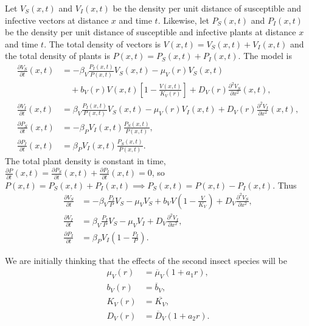\documentclass{jpmarticle}
\begin{document}
Let $V_S(x, t)$ and $V_I(x, t)$ be the density per unit distance of
susceptible and infective vectors at distance $x$ and time $t$.
Likewise, let $P_S(x, t)$ and $P_I(x, t)$ be the density per unit
distance of susceptible and infective plants at distance $x$ and time
$t$.  The total density of vectors is
$V(x, t) = V_S(x, t) + V_I(x, t)$ and the total density of plants is
$P(x, t) = P_S(x, t) + P_I(x, t)$.  The model is
\begin{equation}
  \begin{split}
    \frac{\partial V_S}{\partial t}(x, t)
    &= - \beta_V \frac{P_I(x, t)}{P(x, t)} V_S(x, t)
    - \mu_V(r) V_S(x, t)
    \\
    & \quad
    {} + b_V(r) V(x, t) \left[1 - \frac{V(x, t)}{K_V(r)}\right]
    + D_V(r) \frac{\partial^2 V_S}{\partial x^2}(x, t),
    \\
    \frac{\partial V_I}{\partial t}(x, t)
    &= \beta_V \frac{P_I(x, t)}{P(x, t)} V_S(x, t)
    - \mu_V(r) V_I(x, t)
    + D_V(r) \frac{\partial^2 V_I}{\partial x^2}(x, t),
    \\
    \frac{\partial P_S}{\partial t}(x, t)
    &= - \beta_P V_I(x, t) \frac{P_S(x, t)}{P(x, t)},
    \\
    \frac{\partial P_I}{\partial t}(x, t)
    &= \beta_P V_I(x, t) \frac{P_S(x, t)}{P(x, t)}.
  \end{split}
\end{equation}
The total plant density is constant in time, $\frac{\partial
  P}{\partial t}(x, t) = \frac{\partial P_S}{\partial t}(x, t)
+ \frac{\partial P_I}{\partial t}(x, t) = 0$, so
$P(x, t) = P_S(x, t) + P_I(x, t)
\implies P_S(x, t) = P(x, t) - P_I(x, t)$.  Thus
\begin{equation}
  \label{pdesystemdimensional}
  \begin{split}
    \frac{\partial V_S}{\partial t}
    &= - \beta_V \frac{P_I}{P} V_S
    - \mu_V V_S
    + b_V V \left(1 - \frac{V}{K_V}\right)
    + D_V \frac{\partial^2 V_S}{\partial x^2},
    \\
    \frac{\partial V_I}{\partial t}
    &= \beta_V \frac{P_I}{P} V_S
    - \mu_V V_I
    + D_V \frac{\partial^2 V_I}{\partial x^2},
    \\
    \frac{\partial P_I}{\partial t}
    &= \beta_P V_I \left(1 - \frac{P_I}{P}\right).
  \end{split}
\end{equation}

We are initially thinking that the effects of the second insect
species will be
\begin{equation}
  \begin{split}
    \mu_V(r) &= \overline{\mu}_V (1 + a_1 r),
    \\
    b_V(r) &= \overline{b}_V,
    \\
    K_V(r) &= \overline{K_V},
    \\
    D_V(r) &= \overline{D}_V (1 + a_2 r).
  \end{split}
\end{equation}
\end{document}
